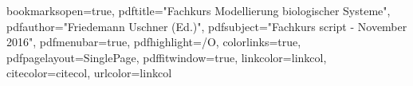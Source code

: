 

\usepackage[intoc]{nomencl}
\renewcommand{\nomname}{List of Abbreviations}

\makenomenclature


\usepackage{ifpdf}

\ifpdf
  \usepackage[pdftex]{graphicx}
  \usepackage[pagebackref,hyperindex=true]{hyperref}
\else
  \usepackage{graphicx}
  \usepackage[a4paper,dvipdfm,pagebackref,hyperindex=true]{hyperref}
\fi

\graphicspath{{.}{images/}}

\renewcommand*{\backref}[1]{}
\renewcommand*{\backrefalt}[4]{%
\ifcase #1 %
(Not cited.)%
\or
(Cited on page~#2.)%
\else
(Cited on pages~#2.)%
\fi}
\renewcommand*{\backrefsep}{, }
\renewcommand*{\backreftwosep}{ and~}
\renewcommand*{\backreflastsep}{ and~}

\usepackage{color}



\hypersetup
{
bookmarksopen=true,
pdftitle="Fachkurs Modellierung biologischer Systeme",
pdfauthor="Friedemann Uschner (Ed.)", 
pdfsubject="Fachkurs script - November 2016", %
pdfmenubar=true, %
pdfhighlight=/O, %
colorlinks=true, %
pdfpagelayout=SinglePage, %
pdffitwindow=true, %
linkcolor=linkcol, %
citecolor=citecol, %
urlcolor=linkcol %
}


